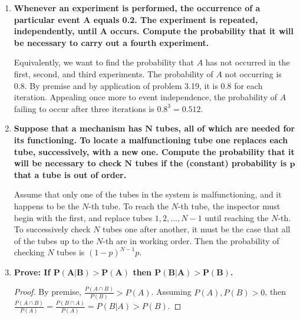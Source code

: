 \documentclass[10pt, oneside]{article}
\begin{document}
\begin{enumerate}[label=3.\arabic*]
\item  \begin{tcolorbox}[
  colback=Cerulean!5!white,
  colframe=Cerulean!75!black]
\textbf{Whenever an experiment is performed, the occurrence of a particular event $\bm{A}$ equals 0.2. The experiment is repeated, independently, until $\bm{A}$ occurs. Compute the probability that it will be necessary to carry out a fourth experiment.}
\end{tcolorbox}

Equivalently, we want to find the probability that $A$ has not occurred in the first, second, and third experiments. The probability of $A$ not occurring is 0.8. By premise and by application of problem 3.19, it is 0.8 for each iteration. Appealing once more to event independence, the probability of $A$ failing to occur after three iterations is $0.8^3 = \boxed{0.512}$.

\item  \begin{tcolorbox}[
  colback=Cerulean!5!white,
  colframe=Cerulean!75!black]
\textbf{Suppose that a mechanism has $\bm{N}$ tubes, all of which are needed for its functioning. To locate a malfunctioning tube one replaces each tube, successively, with a new one. Compute the probability that it will be necessary to check $\bm{N}$ tubes if the (constant) probability is $\bm{p}$ that a tube is out of order.}
\end{tcolorbox}

Assume that only one of the tubes in the system is malfunctioning, and it happens to be the $N$-th tube. To reach the $N$-th tube, the inspector must begin with the first, and replace tubes $1, 2, ..., N-1$ until reaching the $N$-th. To successively check $N$ tubes one after another, it must be the case that all of the tubes up to the $N$-th are in working order. Then the probability of checking $N$ tubes is $\boxed{(1-p)^{N-1} p}$.

\item  \begin{tcolorbox}[
  colback=Cerulean!5!white,
  colframe=Cerulean!75!black]
\textbf{Prove: If $\bm{P(A | B) > P(A)}$ then $\bm{P(B | A) > P(B)}$.}
\end{tcolorbox}

\begin{proof}
By premise, $\frac{P(A \cap B)}{P(B)} > P(A)$. Assuming $P(A), P(B) > 0$, then $\frac{P(A \cap B)}{P(A)}  = \frac{P(B \cap A)}{P(A)} = P(B | A) > P(B)$. 
\end{proof}


\end{enumerate}
\end{document}
